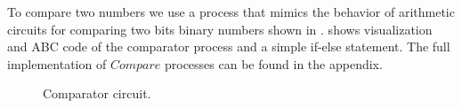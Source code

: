 To compare two numbers we use a process that mimics the behavior of arithmetic circuits for comparing two bits binary numbers shown in 
.
 shows visualization and  ABC code of the comparator process and a simple if-else statement.
The full implementation of $Compare$ processes can be found in the appendix.
\begin{figure}[H]%
\centering
{}
\caption{Comparator circuit.}
\label{tra_comparator_circuit}%
\end{figure}


